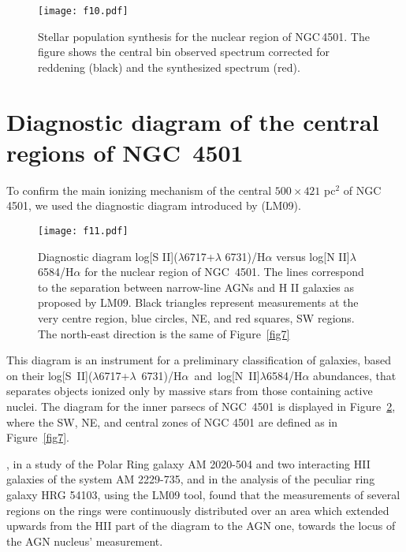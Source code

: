 \documentclass[fleqn,usenatbib]{mnras}
\begin{document}
\begin{figure}
\texttt{[image: f10.pdf]}
\caption{Stellar population synthesis for the nuclear region of NGC\,4501. The figure shows the central
bin observed spectrum corrected for reddening (black)
and the synthesized spectrum (red).}
\label{fig10} 
\end{figure} 
 
 
\section{Diagnostic diagram of the central regions of NGC\, 4501}\label{sec:s8}

To confirm the main ionizing mechanism of the central $500 \times 421$ pc$^2$ of NGC\, 4501, we used the diagnostic diagram introduced by \citet{Lamareille2009} (LM09). 

\begin{figure}
\centering
\texttt{[image: f11.pdf]}
\caption{Diagnostic diagram log[S II]($\lambda$6717+$\lambda$ 6731)/H$\alpha$ versus log[N II]$\lambda$6584/H$\alpha$ for the nuclear region of NGC\, 4501. The lines 
correspond to the separation between narrow-line AGNs and H II galaxies as proposed by LM09. Black triangles represent measurements at the very centre region, blue circles, 
NE, and red squares, SW regions. The north-east direction is the same of Figure~\ref{fig7}}
\label{fig11} 
\end{figure}

This diagram is an instrument for a preliminary classification of galaxies, based on their \mbox{log[S II]($\lambda$6717+$\lambda$ 6731)/H$\alpha$ and 
log[N II]$\lambda$6584/H$\alpha$} abundances, that separates objects ionized only by massive stars from those containing active nuclei. The diagram 
for the inner parsecs of NGC\, 4501 is displayed in Figure~\ref{fig11}, where the SW, NE, and central zones of NGC 4501 are defined as in 
Figure~\ref{fig7}. 

\citet{Freitas-Lemes2012}, in a study of the Polar Ring galaxy AM 2020-504 and two interacting HII galaxies of the system AM 2229-735, and \citet{Faundez-Abans2009} in the analysis 
of the peculiar ring galaxy HRG 54103, using the LM09 tool, found that the measurements of several regions on the rings were continuously distributed over an 
area which extended upwards from the HII part of the diagram to the AGN one, towards the  locus of the AGN nucleus\rq{} measurement.
\end{document}
